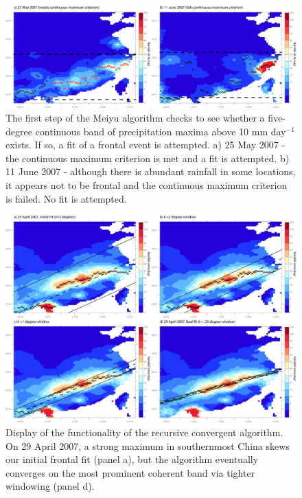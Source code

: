 \documentclass[draft,grl]{agutexSI}
\begin{document}
\begin{article}
\begin{figure}
\noindent\includegraphics[width=36pc]{Figures/S1}
\caption{The first step of the Meiyu algorithm checks to see whether a five-degree continuous band of precipitation maxima above 10 mm day$^{-1}$ exists. If so, a fit of a frontal event is attempted. a) 25 May 2007 - the continuous maximum criterion is met and a fit is attempted. b) 11 June 2007 - although there is abundant rainfall in some locations, it appears not to be frontal and the continuous maximum criterion is failed. No fit is attempted.}
\end{figure}

\begin{figure}

\noindent\includegraphics[width=36pc]{Figures/S2}
\caption{Display of the functionality of the recursive convergent algorithm. On 29 April 2007, a strong maximum in southernmost China skews our initial frontal fit (panel a), but the algorithm eventually converges on the most prominent coherent band via tighter windowing (panel d).}
\end{figure}

\begin{figure}


\end{figure}
\end{article}
\end{document}
